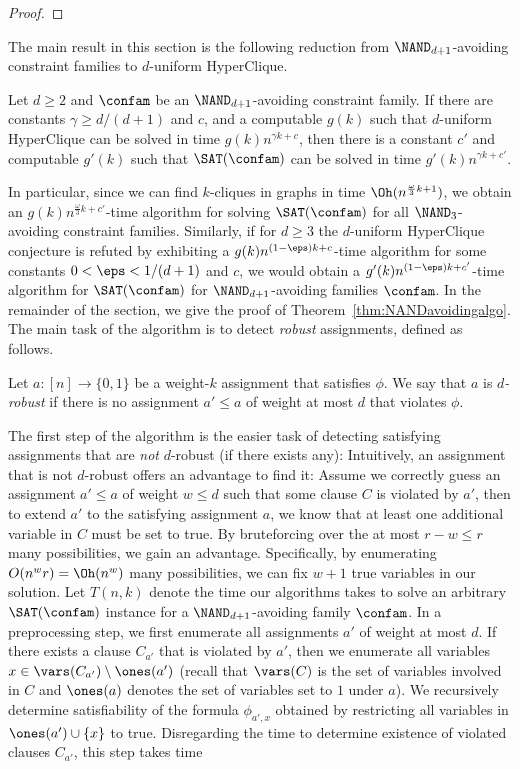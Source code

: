 \begin{proof}
\end{proof}
%
The main result in this section is the following reduction from $\NAND_{d+1}$-avoiding constraint families to $d$-uniform HyperClique.
%
\begin{thm}\label{thm:NANDavoidingalgo}
Let $d\ge 2$ and $\confam$ be an $\NAND_{d+1}$-avoiding constraint family. If there are constants $\gamma \ge d/(d+1)$ and $c$, and a computable $g(k)$ such that $d$-uniform HyperClique can be solved in time $g(k) n^{\gamma k + c}$, then there is a constant $c'$ and computable $g'(k)$ such that $\SAT(\confam)$ can be solved in time $g'(k) n^{\gamma k + c'}$.
\end{thm}
In particular, since we can find $k$-cliques in graphs in time $\Oh(n^{\frac{\omega}{3}k + 1})$, we obtain an $g(k) n^{\frac{\omega}{3}k + c'}$-time algorithm for solving $\SAT(\confam)$ for all $\NAND_3$-avoiding constraint families. Similarly, if for $d\ge 3$ the $d$-uniform HyperClique conjecture is refuted by exhibiting a $g(k)n^{(1-\eps)k+c}$-time algorithm for some constants $0< \eps < 1/(d+1)$ and $c$, we would obtain a $g'(k) n^{(1-\eps)k+c'}$-time algorithm for $\SAT(\confam)$ for $\NAND_{d+1}$-avoiding families $\confam$.
%
In the remainder of the section, we give the proof of Theorem~\ref{thm:NANDavoidingalgo}. 
The main task of the algorithm is to detect \emph{robust} assignments, defined as follows.
%
\begin{defn}
Let $a: [n] \to \{0,1\}$ be a weight-$k$ assignment that satisfies $\phi$. We say that $a$ is \emph{$d$-robust} if there is no assignment $a' \le a$ of weight at most $d$ that violates $\phi$.
\end{defn}
%
The first step of the algorithm is the easier task of detecting satisfying assignments that are \emph{not} $d$-robust (if there exists any):
Intuitively, an assignment that is not $d$-robust offers an advantage to find it: Assume we correctly guess an assignment $a'\le a$ of weight $w \le d$ such that some clause $C$ is violated by $a'$, then to extend $a'$ to the satisfying assignment $a$, we know that at least one additional variable in $C$ must be set to true. By bruteforcing over the at most $r-w \le r$ many possibilities, we gain an advantage. Specifically, by enumerating $O(n^{w}r) = \Oh(n^{w})$ many possibilities, we can fix $w+1$ true variables in our solution.
%
Let $T(n,k)$ denote the time our algorithms takes to solve an arbitrary $\SAT(\confam)$ instance for a $\NAND_{d+1}$-avoiding family $\confam$. 
In a preprocessing step, we first enumerate all assignments $a'$ of weight at most $d$. If there exists a clause $C_{a'}$ that is violated by $a'$, then we enumerate all variables $x \in \vars(C_{a'})\setminus \ones(a')$ (recall that $\vars(C)$ is the set of variables involved in $C$ and $\ones(a)$ denotes the set of variables set to $1$ under $a$). We recursively determine satisfiability of the formula $\phi_{a',x}$ obtained by restricting all variables in $\ones(a') \cup \{x\}$ to true. Disregarding the time to determine existence of violated clauses $C_{a'}$, this step takes time 
